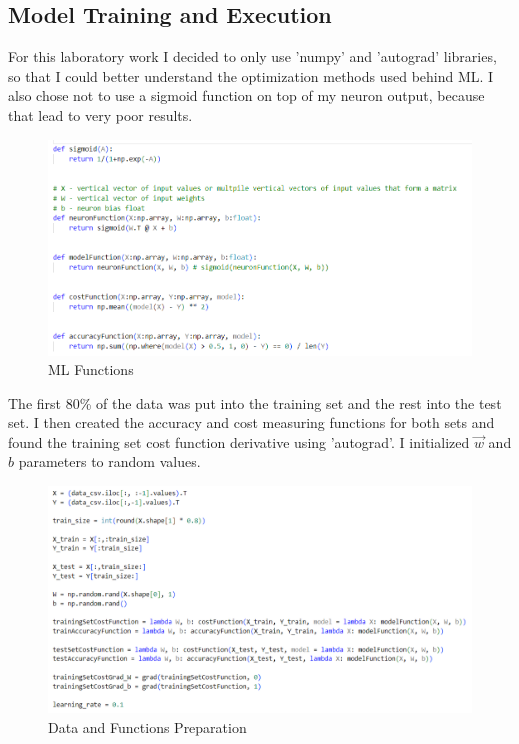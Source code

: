 \documentclass{article}
\begin{document}
        \subsection*{Model Training and Execution}
            For this laboratory work I decided to only use 'numpy' and 'autograd' libraries, so that I could better understand the optimization methods used behind ML. I also chose not to use a sigmoid function on top of my neuron output, because that lead to very poor results.
            \begin{figure}[H]
                \centering
                \includegraphics[width=1\textwidth]{functions.png}
                \caption{ML Functions}
                \label{fig:functions}
            \end{figure}
            The first 80\% of the data was put into the training set and the rest into the test set. I then created the accuracy and cost measuring functions for both sets and found the training set cost function derivative using 'autograd'. I initialized $\vec{w}$ and $b$ parameters to random values.
            \begin{figure}[H]
                \centering
                \includegraphics[width=1\textwidth]{data-split.png}
                \caption{Data and Functions Preparation}
                \label{fig:data-split}
            \end{figure}
\end{document}
